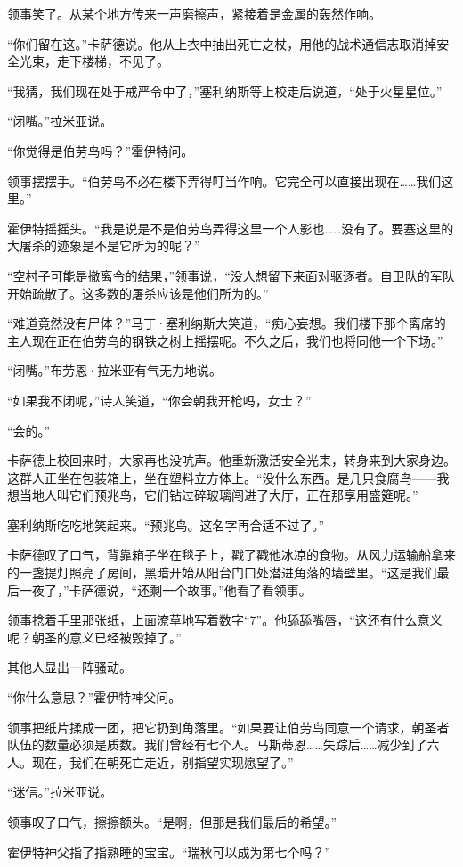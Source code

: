 \documentclass[AutoFakeBold=true]{book}
\begin{document}
领事笑了。从某个地方传来一声磨擦声，紧接着是金属的轰然作响。

``你们留在这。''卡萨德说。他从上衣中抽出死亡之杖，用他的战术通信志取消掉安全光束，走下楼梯，不见了。

``我猜，我们现在处于戒严令中了，''塞利纳斯等上校走后说道，``处于火星星位。''

``闭嘴。''拉米亚说。

``你觉得是伯劳鸟吗？''霍伊特问。

领事摆摆手。``伯劳鸟不必在楼下弄得叮当作响。它完全可以直接出现在……我们这里。''

霍伊特摇摇头。``我是说是不是伯劳鸟弄得这里一个人影也……没有了。要塞这里的大屠杀的迹象是不是它所为的呢？''

``空村子可能是撤离令的结果，''领事说，``没人想留下来面对驱逐者。自卫队的军队开始疏散了。这多数的屠杀应该是他们所为的。''

``难道竟然没有尸体？''马丁·塞利纳斯大笑道，``痴心妄想。我们楼下那个离席的主人现在正在伯劳鸟的钢铁之树上摇摆呢。不久之后，我们也将同他一个下场。''

``闭嘴。''布劳恩·拉米亚有气无力地说。

``如果我不闭呢，''诗人笑道，``你会朝我开枪吗，女士？''

``会的。''

卡萨德上校回来时，大家再也没吭声。他重新激活安全光束，转身来到大家身边。这群人正坐在包装箱上，坐在塑料立方体上。``没什么东西。是几只食腐鸟——我想当地人叫它们预兆鸟，它们钻过碎玻璃闯进了大厅，正在那享用盛筵呢。''

塞利纳斯吃吃地笑起来。``预兆鸟。这名字再合适不过了。''

卡萨德叹了口气，背靠箱子坐在毯子上，戳了戳他冰凉的食物。从风力运输船拿来的一盏提灯照亮了房间，黑暗开始从阳台门口处潜进角落的墙壁里。``这是我们最后一夜了，''卡萨德说，``还剩一个故事。''他看了看领事。

领事捻着手里那张纸，上面潦草地写着数字``7''。他舔舔嘴唇，``这还有什么意义呢？朝圣的意义已经被毁掉了。''

其他人显出一阵骚动。

``你什么意思？''霍伊特神父问。

领事把纸片揉成一团，把它扔到角落里。``如果要让伯劳鸟同意一个请求，朝圣者队伍的数量必须是质数。我们曾经有七个人。马斯蒂恩……失踪后……减少到了六人。现在，我们在朝死亡走近，别指望实现愿望了。''

``迷信。''拉米亚说。

领事叹了口气，擦擦额头。``是啊，但那是我们最后的希望。''

霍伊特神父指了指熟睡的宝宝。``瑞秋可以成为第七个吗？''
\end{document}
